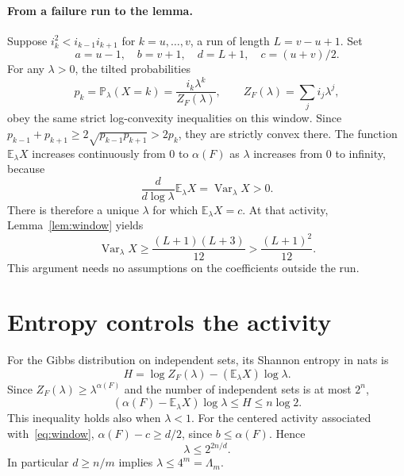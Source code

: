 \documentclass[11pt]{article}
\newcommand{\E}{\mathbb E}
\newcommand{\Pp}{\mathbb P}
\newcommand{\Var}{\operatorname{Var}}
\begin{document}
\paragraph{From a failure run to the lemma.}
Suppose $i_k^2<i_{k-1}i_{k+1}$ for $k=u,\ldots,v$, a run of length
$L=v-u+1$. Set
\begin{equation}\label{eq:window}
 a=u-1,\quad b=v+1,\quad d=L+1,\quad c=(u+v)/2.
\end{equation}
For any $\lambda>0$, the tilted probabilities
\[
 p_k=\Pp_\lambda(X=k)=\frac{i_k\lambda^k}{Z_F(\lambda)},\qquad
 Z_F(\lambda)=\sum_j i_j\lambda^j,
\]
obey the same strict log-convexity inequalities on this window. Since
$p_{k-1}+p_{k+1}\ge2\sqrt{p_{k-1}p_{k+1}}>2p_k$, they are strictly
convex there.
The function $\E_\lambda X$ increases continuously from $0$ to
$\alpha(F)$ as $\lambda$ increases from $0$ to infinity, because
\[
 \frac{d}{d\log\lambda}\E_\lambda X=\Var_\lambda X>0.
\]
There is therefore a unique $\lambda$ for which $\E_\lambda X=c$.
At that activity, Lemma~\ref{lem:window} yields
\begin{equation}\label{eq:run-variance}
 \Var_\lambda X\ge\frac{(L+1)(L+3)}{12}>\frac{(L+1)^2}{12}.
\end{equation}
This argument needs no assumptions on the coefficients outside the run.

\section{Entropy controls the activity}
For the Gibbs distribution on independent sets, its Shannon entropy in
nats is
\[
 H=\log Z_F(\lambda)-(\E_\lambda X)\log\lambda.
\]
Since $Z_F(\lambda)\ge\lambda^{\alpha(F)}$ and the number of independent
sets is at most $2^n$,
\begin{equation}\label{eq:entropy}
 (\alpha(F)-\E_\lambda X)\log\lambda\le H\le n\log2.
\end{equation}
This inequality holds also when $\lambda<1$.
For the centered activity associated with~\eqref{eq:window},
$\alpha(F)-c\ge d/2$, since $b\le\alpha(F)$. Hence
\begin{equation}\label{eq:activity}
 \lambda\le 2^{2n/d}.
\end{equation}
In particular $d\ge n/m$ implies $\lambda\le4^m=\Lambda_m$.
\end{document}
